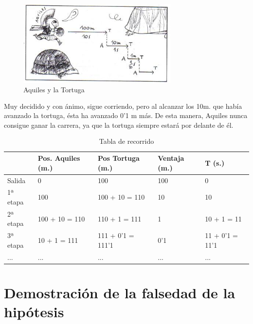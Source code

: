 \documentclass[a4paper,12pt]{article}
\begin{document}
   \begin{figure}[h]
   \begin{center}
   \includegraphics[width=8cm]{Imagenes/aquiles2.jpg}
   \end{center}
   \caption{Aquiles y la Tortuga}
   \label{fig:playa}
   \end{figure}
   
   Muy decidido y con ánimo, sigue corriendo, pero al alcanzar los 10m.
   que había avanzado la tortuga, ésta ha avanzado 0'1 m más.  
   De esta manera, Aquiles nunca consigue ganar la carrera, ya que la tortuga
   siempre estará por delante de él.
   
   \begin{table}[h]
   \begin{center}
   \begin{tabular}{|l|l|l|l|l|}
   \hline
            & Pos. Aquiles (m.) &  Pos Tortuga (m.)  & Ventaja (m.) & T (s.)           \\ \hline
    Salida  & 0                 &  100               & 100          & 0                \\ \hline
   1ª etapa & 100               &  100 + 10 = 110    & 10           & 10               \\ \hline
   2ª etapa & 100 + 10 = 110    &  110 + 1 = 111     & 1            & 10 + 1 = 11      \\ \hline 
   3ª etapa & 10 + 1 = 111      &  111 + 0'1 = 111'1 & 0'1          & 11 + 0'1 = 11'1  \\ \hline 
   ...      & ...               &  ...               & ...          & ...              \\ \hline 
 
   \end{tabular}
   \end{center}
   \caption{Tabla de recorrido}
   \label{tab:ejemplo}
   \end{table}
   
   \section{Demostración de la falsedad de la hipótesis}
   
\end{document}
